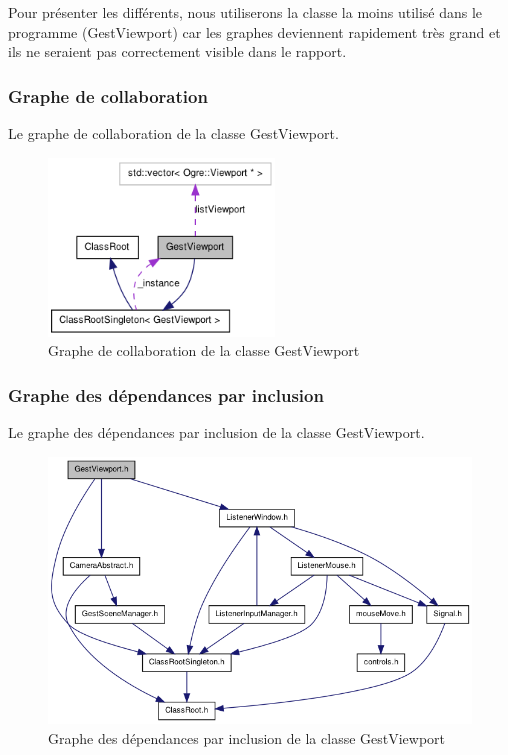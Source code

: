\documentclass[frenchb,twoside]{EPURapport}
\begin{document}
		
		Pour présenter les différents, nous utiliserons la classe la moins utilisé dans le programme
		(GestViewport) car les graphes deviennent rapidement très grand et ils ne seraient
		pas correctement visible dans le rapport.
		
			\subsubsection{Graphe de collaboration}
			Le graphe de collaboration de la classe GestViewport.
			\begin{figure}[h]
				\centering
				\includegraphics[width=6cm]{images/graph_collaboration_gestviewport.png}
				\caption{\label{fig:graph_collaboration_gestviewport}Graphe de collaboration de la classe GestViewport}
			\end{figure}
			
			
			\subsubsection{Graphe des dépendances par inclusion}
			Le graphe des dépendances par inclusion de la classe GestViewport.
			\begin{figure}[h]
				\centering
				\includegraphics[width=15cm]{images/graph_dependance_gestviewport.png}
				\caption{\label{fig:graph_dependance_gestviewport}Graphe des dépendances par inclusion de la classe GestViewport}
			\end{figure}
			
\end{document}
